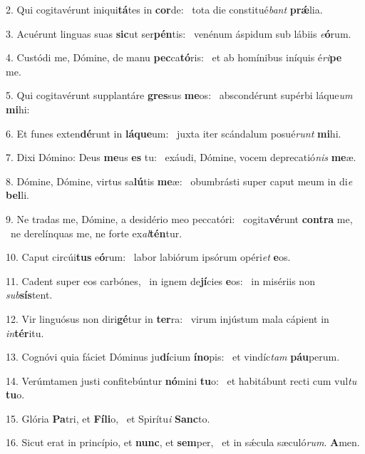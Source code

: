 2. Qui cogitavérunt iniqui\textbf{tá}tes in \textbf{cor}de: \ast\  tota die constitué\textit{bant} \textbf{prǽ}lia.\

3. Acuérunt linguas suas \textbf{sic}ut ser\textbf{pén}tis: \ast\  venénum áspidum sub lábiis \textit{e}\textbf{ó}rum.\

4. Custódi me, Dómine, de manu \textbf{pec}ca\textbf{tó}ris: \ast\  et ab homínibus iníquis é\textit{ri}\textbf{pe} me.\

5. Qui cogitavérunt supplantáre \textbf{gres}sus \textbf{me}os: \ast\  abscondérunt supérbi láque\textit{um} \textbf{mi}hi:\

6. Et funes exten\textbf{dé}runt in \textbf{lá}\textbf{que}um: \ast\  juxta iter scándalum posué\textit{runt} \textbf{mi}hi.\

7. Dixi Dómino: Deus \textbf{me}us \textbf{es} tu: \ast\  exáudi, Dómine, vocem deprecatió\textit{nis} \textbf{me}æ.\

8. Dómine, Dómine, virtus sa\textbf{lú}tis \textbf{me}æ: \ast\  obumbrásti super caput meum in di\textit{e} \textbf{bel}li.\

9. Ne tradas me, Dómine, a desidério meo peccatóri: \dag\  cogita\textbf{vé}runt \textbf{con}\textbf{tra} me, \ast\  ne derelínquas me, ne forte ex\textit{al}\textbf{tén}tur.\

10. Caput circúi\textbf{tus} e\textbf{ó}rum: \ast\  labor labiórum ipsórum opéri\textit{et} \textbf{e}os.\

11. Cadent super eos carbónes, \dag\  in ignem de\textbf{jí}cies \textbf{e}os: \ast\  in misériis non \textit{sub}\textbf{sís}tent.\

12. Vir linguósus non diri\textbf{gé}tur in \textbf{ter}ra: \ast\  virum injústum mala cápient in \textit{in}\textbf{tér}itu.\

13. Cognóvi quia fáciet Dóminus ju\textbf{dí}cium \textbf{ín}\textbf{o}pis: \ast\  et vindíc\textit{tam} \textbf{páu}perum.\

14. Verúmtamen justi confitebúntur \textbf{nó}mini \textbf{tu}o: \ast\  et habitábunt recti cum vul\textit{tu} \textbf{tu}o.\

15. Glória \textbf{Pa}tri, et \textbf{Fí}\textbf{li}o, \ast\  et Spirítu\textit{i} \textbf{Sanc}to.\

16. Sicut erat in princípio, et \textbf{nunc}, et \textbf{sem}per, \ast\  et in sǽcula sæculó\textit{rum}. \textbf{A}men.\

